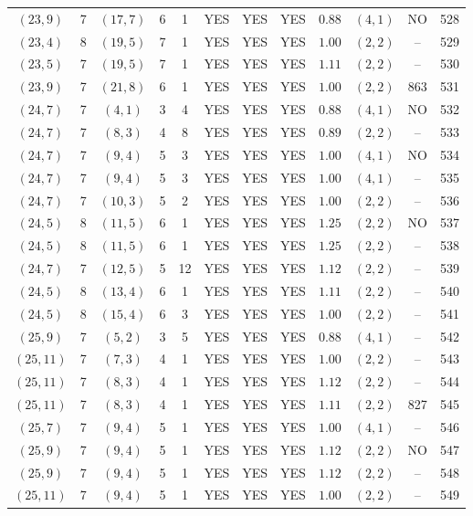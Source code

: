 \begin{longtable}{|c|c|c|c|c|c|c|c|c|c|c|c|}
$(23,9)$ & 7 & $(17,7)$ & 6 & 1 & YES & YES & YES & $0.88$ & $(4,1)$ & NO & 528\\
$(23,4)$ & 8 & $(19,5)$ & 7 & 1 & YES & YES & YES & $1.00$ & $(2,2)$ & -- & 529\\
$(23,5)$ & 7 & $(19,5)$ & 7 & 1 & YES & YES & YES & $1.11$ & $(2,2)$ & -- & 530\\
$(23,9)$ & 7 & $(21,8)$ & 6 & 1 & YES & YES & YES & $1.00$ & $(2,2)$ & 863 & 531\\
$(24,7)$ & 7 & $(4,1)$ & 3 & 4 & YES & YES & YES & $0.88$ & $(4,1)$ & NO & 532\\
$(24,7)$ & 7 & $(8,3)$ & 4 & 8 & YES & YES & YES & $0.89$ & $(2,2)$ & -- & 533\\
$(24,7)$ & 7 & $(9,4)$ & 5 & 3 & YES & YES & YES & $1.00$ & $(4,1)$ & NO & 534\\
$(24,7)$ & 7 & $(9,4)$ & 5 & 3 & YES & YES & YES & $1.00$ & $(4,1)$ & -- & 535\\
$(24,7)$ & 7 & $(10,3)$ & 5 & 2 & YES & YES & YES & $1.00$ & $(2,2)$ & -- & 536\\
$(24,5)$ & 8 & $(11,5)$ & 6 & 1 & YES & YES & YES & $1.25$ & $(2,2)$ & NO & 537\\
$(24,5)$ & 8 & $(11,5)$ & 6 & 1 & YES & YES & YES & $1.25$ & $(2,2)$ & -- & 538\\
$(24,7)$ & 7 & $(12,5)$ & 5 & 12 & YES & YES & YES & $1.12$ & $(2,2)$ & -- & 539\\
$(24,5)$ & 8 & $(13,4)$ & 6 & 1 & YES & YES & YES & $1.11$ & $(2,2)$ & -- & 540\\
$(24,5)$ & 8 & $(15,4)$ & 6 & 3 & YES & YES & YES & $1.00$ & $(2,2)$ & -- & 541\\
$(25,9)$ & 7 & $(5,2)$ & 3 & 5 & YES & YES & YES & $0.88$ & $(4,1)$ & -- & 542\\
$(25,11)$ & 7 & $(7,3)$ & 4 & 1 & YES & YES & YES & $1.00$ & $(2,2)$ & -- & 543\\
$(25,11)$ & 7 & $(8,3)$ & 4 & 1 & YES & YES & YES & $1.12$ & $(2,2)$ & -- & 544\\
$(25,11)$ & 7 & $(8,3)$ & 4 & 1 & YES & YES & YES & $1.11$ & $(2,2)$ & 827 & 545\\
$(25,7)$ & 7 & $(9,4)$ & 5 & 1 & YES & YES & YES & $1.00$ & $(4,1)$ & -- & 546\\
$(25,9)$ & 7 & $(9,4)$ & 5 & 1 & YES & YES & YES & $1.12$ & $(2,2)$ & NO & 547\\
$(25,9)$ & 7 & $(9,4)$ & 5 & 1 & YES & YES & YES & $1.12$ & $(2,2)$ & -- & 548\\
$(25,11)$ & 7 & $(9,4)$ & 5 & 1 & YES & YES & YES & $1.00$ & $(2,2)$ & -- & 549\\

\end{longtable}
